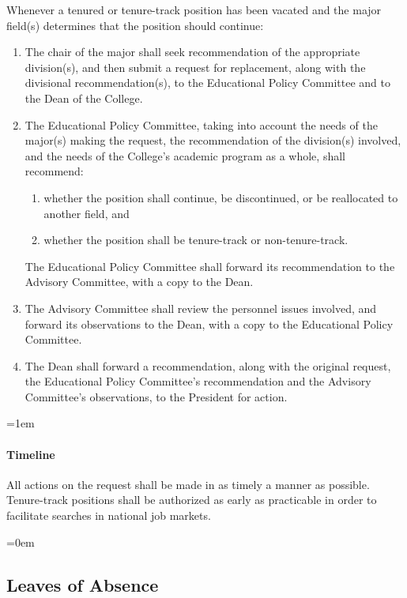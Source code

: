 \documentclass{manual}
\let\oldsubsection\subsection
\renewcommand\subsection{\leftskip=0em\oldsubsection}
\let\oldparagraph\paragraph
\renewcommand\paragraph{\leftskip=1em\oldparagraph}
\newcommand{\itemLevelA}{\alph*.}
\newcommand{\itemLevelB}{\arabic*)}
\newcommand{\itemRefA}{\alph*}
\newcommand{\itemRefB}{\arabic*}
\begin{document}
			Whenever a tenured or tenure-track position has been vacated and the major field(s) determines that the position should continue:

				\begin{enumerate}[label=\itemLevelA,ref=\itemRefA]
				\item  The chair of the major shall seek recommendation of the appropriate division(s), and then submit a request for replacement, along with the divisional recommendation(s), to the Educational Policy Committee and to the Dean of the College.
				\item  The Educational Policy Committee, taking into account the needs of the major(s) making the request, the recommendation of the division(s) involved, and the needs of the College's academic program as a whole, shall recommend:

					\begin{enumerate}[label=\itemLevelB,ref=\itemRefB]
					\item whether the position shall continue, be discontinued, or be reallocated to another field, and
					\item whether the position shall be tenure-track or non-tenure-track.
					\end{enumerate}

				The Educational Policy Committee shall forward its recommendation to the Advisory Committee, with a copy to the Dean.

				\item The Advisory Committee shall review the personnel issues involved, and forward its observations to the Dean, with a copy to the Educational Policy Committee.

				\item The Dean shall forward a recommendation, along with the original request, the Educational Policy Committee's recommendation and the Advisory Committee's observations, to the President for action.

				\end{enumerate}

			\paragraph{Timeline} 
			All actions on the request shall be made in as timely a manner as possible. Tenure-track positions shall be authorized as early as practicable in order to facilitate searches in national job markets.

	\subsection{Leaves of Absence}\label{sec:LeavesOfAbsence}
\end{document}
